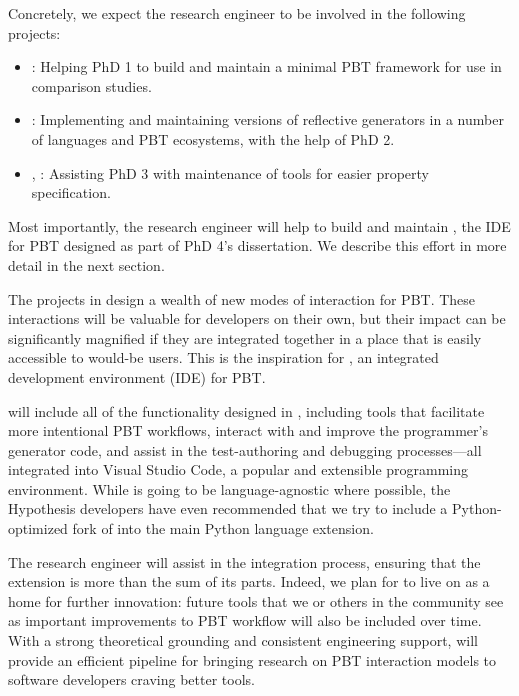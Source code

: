 Concretely, we expect the research engineer to be involved in the following
projects:
\begin{itemize}[noitemsep]
  \item {}: Helping PhD 1 to build and maintain a minimal PBT
  framework for use in comparison studies.
  \item {}: Implementing and maintaining versions of
  reflective generators in a number of languages and PBT ecosystems, with the
  help of PhD 2.
  \item {}, : Assisting PhD
  3 with maintenance of tools for easier property specification.
\end{itemize}
Most importantly, the research engineer will help to build and maintain
\tyche{}, the IDE for PBT designed as part of PhD 4's dissertation. We
describe this effort in more detail in the next section.

The projects in  design a wealth of new modes of interaction
for PBT. These interactions will be valuable for developers on their own, but
their impact can be significantly magnified if they are integrated together in a
place that is easily accessible to would-be users. This is the inspiration for
\tyche{}, an integrated development environment (IDE) for PBT.

\tyche{} will include all of the functionality designed in ,
including tools that facilitate more intentional PBT workflows, interact with
and improve the programmer's generator code, and assist in the test-authoring
and debugging processes---all integrated into Visual Studio Code, a popular
and extensible programming environment.
While \tyche{} is going to be language-agnostic where possible, the Hypothesis
developers have even recommended that we try to include a Python-optimized fork of
\tyche{} into the main Python language extension.

The research engineer will assist in the integration process, ensuring that the
extension is more than the sum of its parts. Indeed, we plan for \tyche{} to
live on as a home for further innovation: future tools that we or others in the
community see as important improvements to PBT workflow will also be included
over time.  With a strong theoretical grounding and consistent engineering
support, \tyche{} will provide an efficient pipeline for bringing research on
PBT interaction models to software developers craving better tools.

